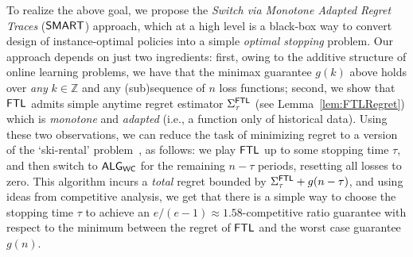 To realize the above goal, we propose the \emph{Switch via Monotone Adapted Regret Traces} ($\mathsf{SMART}$) approach, which at a high level is a black-box way to convert design of instance-optimal policies into a simple \emph{optimal stopping} problem. 
Our approach depends on just two ingredients: first, owing to the additive structure of online learning problems, we have that the minimax guarantee $g(k)$ above holds over \emph{any} $k\in\mathbb{Z}$ and any (sub)sequence of $n$ loss functions; second, we show that $\mathsf{FTL}$ admits simple anytime regret estimator $\Sigma^{\mathsf{FTL}}_{\tau}$ (see Lemma~\ref{lem:FTLRegret}) which is \emph{monotone} and \emph{adapted} (i.e., a function only of historical data). Using these two observations, we can reduce the task of minimizing regret to a version of the `ski-rental' problem~\citep{karlin1994competitive,borodin2005online}, as follows:
we play $\mathsf{FTL}$ up to some stopping time $\tau$, and then switch to $\mathsf{ALG}_{\mathsf{WC}}$ for the remaining $n-\tau$ periods, resetting all losses to zero. This algorithm  incurs a \emph{total} regret bounded by $\Sigma^{\mathsf{FTL}}_{\tau} + g(n-\tau)$, and using ideas from competitive analysis, we get that there is a simple way to choose the stopping time $\tau$ to achieve an $e/(e-1) \approx 1.58$-competitive ratio guarantee with respect to the minimum between the regret of $\mathsf{FTL}$ and the worst case guarantee $g(n)$.

